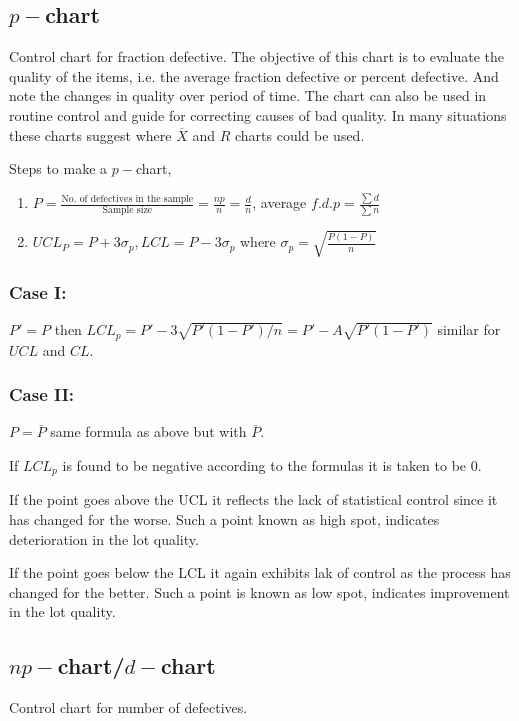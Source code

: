 \documentclass[oneside,11pt,pdftex]{book}%
\numberwithin{equation}{section}
\numberwithin{section}{chapter}
\numberwithin{equation}{chapter}
\begin{document}
\subsection{$ p -$chart}
Control chart for fraction defective. The objective of this chart is to evaluate the quality of the items, i.e. the average fraction defective or percent defective. And note the changes in quality over period of time. The chart can also be used in routine control and guide for correcting causes of bad quality. In many situations these charts suggest where $ \overline{X} $ and $ R $ charts could be used.\par
Steps to make a $ p- $chart,
\begin{enumerate}
	\item $ P=\frac{\text{No. of defectives in the sample}}{\text{Sample size}}=\frac{np}{n} = \frac{d}{n}$, average $ f.d.p=\frac{\sum d}{\sum n} $
	\item $ UCL_P=P+3\sigma_p, LCL=P-3\sigma_p $ where $ \sigma_p=\sqrt{\frac{P(1-P)}{n}} $
\end{enumerate}
\subsubsection{Case I:}
$ P'=P $ then $ LCL_p=P'-3\sqrt{P'(1-P')/n}=P'-A\sqrt{P'(1-P')} $ similar for $ UCL $ and $ CL $.

\subsubsection{Case II:}
$ P=\overline{P} $
same formula as above but with $ \overline{P} $.

If $ LCL_p $ is found to be negative according to the formulas it is taken to be $ 0 $.

If the point goes above the UCL it reflects the lack of statistical control since it has changed for the worse. Such a point known as high spot, indicates deterioration in the lot quality. 

If the point goes below the LCL it again exhibits lak of control as the process has changed for the better. Such a point is known as low spot, indicates improvement in the lot quality.

\subsection{$ np-$chart/$ d-$chart}
Control chart for number of defectives.
\end{document}

